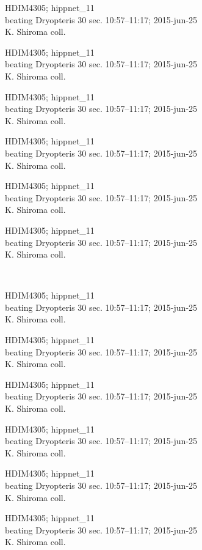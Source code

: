 \documentclass[2pt]{extarticle}
\begin{document}
\noindent
\parbox{0.16\textwidth}{\tiny \raggedright \rule[-0.3\baselineskip]{0pt}{10pt}HDIM4305; hippnet\_11\\ beating Dryopteris 30 sec. 10:57--11:17; 2015-jun-25\\ K. Shiroma coll.}
\parbox{0.16\textwidth}{\tiny \raggedright \rule[-0.3\baselineskip]{0pt}{10pt}HDIM4305; hippnet\_11\\ beating Dryopteris 30 sec. 10:57--11:17; 2015-jun-25\\ K. Shiroma coll.}
\parbox{0.16\textwidth}{\tiny \raggedright \rule[-0.3\baselineskip]{0pt}{10pt}HDIM4305; hippnet\_11\\ beating Dryopteris 30 sec. 10:57--11:17; 2015-jun-25\\ K. Shiroma coll.}
\parbox{0.16\textwidth}{\tiny \raggedright \rule[-0.3\baselineskip]{0pt}{10pt}HDIM4305; hippnet\_11\\ beating Dryopteris 30 sec. 10:57--11:17; 2015-jun-25\\ K. Shiroma coll.}
\parbox{0.16\textwidth}{\tiny \raggedright \rule[-0.3\baselineskip]{0pt}{10pt}HDIM4305; hippnet\_11\\ beating Dryopteris 30 sec. 10:57--11:17; 2015-jun-25\\ K. Shiroma coll.}
\parbox{0.16\textwidth}{\tiny \raggedright \rule[-0.3\baselineskip]{0pt}{10pt}HDIM4305; hippnet\_11\\ beating Dryopteris 30 sec. 10:57--11:17; 2015-jun-25\\ K. Shiroma coll.} \\ 
\vspace{0.001in} 

\noindent
\parbox{0.16\textwidth}{\tiny \raggedright \rule[-0.3\baselineskip]{0pt}{10pt}HDIM4305; hippnet\_11\\ beating Dryopteris 30 sec. 10:57--11:17; 2015-jun-25\\ K. Shiroma coll.}
\parbox{0.16\textwidth}{\tiny \raggedright \rule[-0.3\baselineskip]{0pt}{10pt}HDIM4305; hippnet\_11\\ beating Dryopteris 30 sec. 10:57--11:17; 2015-jun-25\\ K. Shiroma coll.}
\parbox{0.16\textwidth}{\tiny \raggedright \rule[-0.3\baselineskip]{0pt}{10pt}HDIM4305; hippnet\_11\\ beating Dryopteris 30 sec. 10:57--11:17; 2015-jun-25\\ K. Shiroma coll.}
\parbox{0.16\textwidth}{\tiny \raggedright \rule[-0.3\baselineskip]{0pt}{10pt}HDIM4305; hippnet\_11\\ beating Dryopteris 30 sec. 10:57--11:17; 2015-jun-25\\ K. Shiroma coll.}
\parbox{0.16\textwidth}{\tiny \raggedright \rule[-0.3\baselineskip]{0pt}{10pt}HDIM4305; hippnet\_11\\ beating Dryopteris 30 sec. 10:57--11:17; 2015-jun-25\\ K. Shiroma coll.}
\parbox{0.16\textwidth}{\tiny \raggedright \rule[-0.3\baselineskip]{0pt}{10pt}HDIM4305; hippnet\_11\\ beating Dryopteris 30 sec. 10:57--11:17; 2015-jun-25\\ K. Shiroma coll.} \\ 
\vspace{0.001in} 
\end{document}
